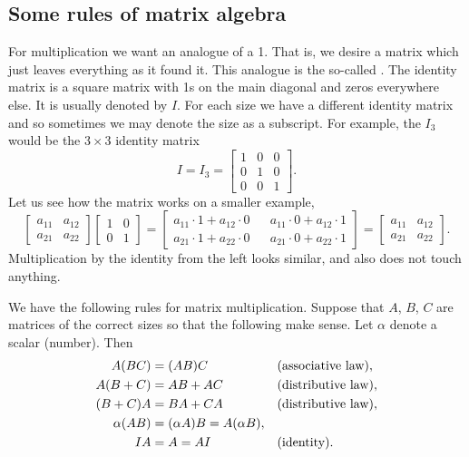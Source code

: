 \subsection{Some rules of matrix algebra}

For multiplication we want an analogue of a 1.  That is,
we desire a matrix which just leaves everything as it found it.
This analogue is the
so-called \emph{}.
The identity matrix is a square matrix with 1s on the
main diagonal and zeros everywhere else.  It is usually denoted by $I$.
For each size we have a different identity matrix and so sometimes we may denote
the size as a subscript.  For example, the $I_3$ would be the $3 \times 3$
identity matrix
\begin{equation*}
I = I_3 =
\begin{bmatrix}
1 & 0 & 0 \\
0 & 1 & 0 \\
0 & 0 & 1
\end{bmatrix} .
\end{equation*}
Let us see how the matrix works on a smaller example,
\begin{equation*}
\begin{bmatrix}
a_{11} & a_{12} \\
a_{21} & a_{22} 
\end{bmatrix}
\begin{bmatrix}
1 & 0 \\
0 & 1
\end{bmatrix} =
\begin{bmatrix}
a_{11} \cdot 1 + a_{12} \cdot 0
& &
a_{11} \cdot 0 + a_{12} \cdot 1
\\
a_{21} \cdot 1 + a_{22} \cdot 0
& &
a_{21} \cdot 0 + a_{22} \cdot 1
\end{bmatrix}
=
\begin{bmatrix}
a_{11} & a_{12} \\
a_{21} & a_{22} 
\end{bmatrix} .
\end{equation*}
Multiplication by the identity from the left looks similar, and also
does not touch anything.

\medskip

We have the following rules for matrix multiplication.  Suppose that
$A$, $B$, $C$ are matrices of the correct sizes so that the following
make sense.  Let $\alpha$ denote a scalar (number).  Then
\begin{align*}
A(BC) & = (AB)C & & \text{(\myindex{associative law})} , \\
A(B+C) & = AB + AC & & \text{(\myindex{distributive law})} , \\
(B+C)A & = BA + CA & & \text{(distributive law)} , \\
\alpha(AB) & = (\alpha A)B = A(\alpha B) , & &  \\
IA & = A = AI & & \text{(identity)}.
\end{align*}

